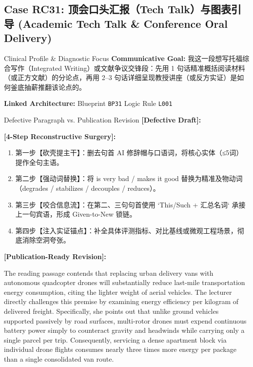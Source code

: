 \subsection{Case RC31: 顶会口头汇报（Tech Talk）与图表引导 (Academic Tech Talk \& Conference Oral Delivery)}\label{case:RC31}
\begin{ConceptBox}{Clinical Profile \& Diagnostic Focus}
\textbf{Communicative Goal:} 我这一段想写托福综合写作（Integrated Writing）或文献争议交锋段：先用 1 句话精准概括阅读材料（或正方文献）的分论点，再用 2--3 句话详细呈现教授讲座（或反方实证）是如何釜底抽薪推翻该论点的。\par
\textbf{Linked Architecture:} Blueprint \texttt{BP31} \enspace\textbar\enspace Logic Rule \texttt{L001}
\end{ConceptBox}
\begin{ExampleBox}{Defective Paragraph vs. Publication Revision}
\textbf{\color{TargetHighlight}[Defective Draft]:}\par
{}\par\vspace{6pt}
\textbf{\color{AcadForest}[4-Step Reconstructive Surgery]:}
\begin{enumerate}[label=\textbf{\color{AcadNavy}Step \arabic*:}, leftmargin=2em]
  \item 第一步【砍壳提主干】：删去句首 AI 修辞帽与口语词，将核心实体（≤5词）提作全句主语。
  \item 第二步【强动词替换】：将 is very bad / makes it good 替换为精准及物动词（degrades / stabilizes / decouples / reduces）。
  \item 第三步【咬合信息流】：在第二、三句句首使用 `This/Such + 汇总名词` 承接上一句宾语，形成 Given-to-New 锁链。
  \item 第四步【注入实证锚点】：补全具体评测指标、对比基线或微观工程场景，彻底消除空洞夸张。
\end{enumerate}\vspace{4pt}
\textbf{\color{AcadNavy}[Publication-Ready Revision]:}\par
The reading passage contends that replacing urban delivery vans with autonomous quadcopter drones will substantially reduce last-mile transportation energy consumption, citing the lighter weight of aerial vehicles. The lecturer directly challenges this premise by examining energy efficiency per kilogram of delivered freight. Specifically, she points out that unlike ground vehicles supported passively by road surfaces, multi-rotor drones must expend continuous battery power simply to counteract gravity and headwinds while carrying only a single parcel per trip. Consequently, servicing a dense apartment block via individual drone flights consumes nearly three times more energy per package than a single consolidated van route.
\end{ExampleBox}
